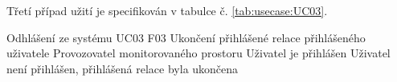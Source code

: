 
Třetí případ užití je specifikován v tabulce č. \ref{tab:usecase:UC03}.

\begin{UseCaseTable}
  {Odhlášení ze systému}
  {UC03}
  {F03}
  {Ukončení přihlášené relace přihlášeného uživatele}
  {Provozovatel monitorovaného prostoru}
  {}
  {Uživatel je přihlášen}
  {Uživatel není přihlášen, přihlášená relace byla ukončena}


\end{UseCaseTable}
